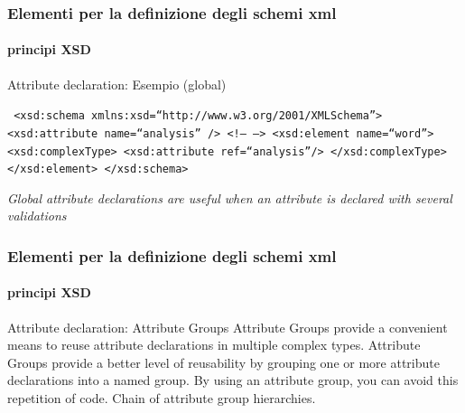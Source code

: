 \begin{frame}
	\frametitle{Elementi per la definizione degli schemi xml}
	\framesubtitle{principi XSD}
	\addtocounter{nframe}{1}

	\begin{block}{Attribute declaration: Esempio (global)}

		\texttt{
			<xsd:schema xmlns:xsd=``http://www.w3.org/2001/XMLSchema''>
			<xsd:attribute name=``analysis'' />
			<!-- -->
			<xsd:element name=``word''>
			<xsd:complexType>
			<xsd:attribute ref=``analysis''/>
			</xsd:complexType>
			</xsd:element>
			</xsd:schema>
		}

	\end{block}

	\textit{Global attribute declarations are useful when an attribute is declared with several validations}


\end{frame}






\begin{frame}
	\frametitle{Elementi per la definizione degli schemi xml}
	\framesubtitle{principi XSD}
	\addtocounter{nframe}{1}

	\begin{block}{Attribute declaration: Attribute Groups}
		Attribute Groups provide a convenient means to reuse attribute declarations in multiple complex types. Attribute Groups provide a better level of reusability by grouping one or more attribute declarations into a named group. By using an attribute group, you can avoid this repetition of code. Chain of attribute group hierarchies.
	\end{block}
\end{frame}



